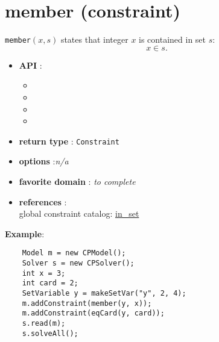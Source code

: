 \label{member}
\hypertarget{member}{}

\section{member (constraint)}\label{member:memberconstraint}\hypertarget{member:memberconstraint}{}

\begin{notedef}
  \texttt{member}$(x,s)$ states that integer $x$ is contained in set
  $s$:
$$x\in s.$$
\end{notedef}

\begin{itemize}
	\item \textbf{API} :
	\begin{itemize}
		\item {}
		\item {}
		\item {}
		\item {}
	\end{itemize}
	\item \textbf{return type} : \texttt{Constraint}
	\item \textbf{options} :\emph{n/a}
	\item \textbf{favorite domain} : \emph{to complete}
	\item \textbf{references} :\\
      global constraint catalog: \href{http://www.emn.fr/x-info/sdemasse/gccat/Cin_set.html}{in\_set}
\end{itemize}

\textbf{Example}:
\begin{lstlisting}
	Model m = new CPModel();
	Solver s = new CPSolver();
	int x = 3;
	int card = 2;
	SetVariable y = makeSetVar("y", 2, 4);
	m.addConstraint(member(y, x));
	m.addConstraint(eqCard(y, card));
	s.read(m);
	s.solveAll();
\end{lstlisting} 
